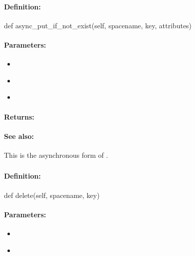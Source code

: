 \paragraph{Definition:}
\begin{pythoncode}
def async_put_if_not_exist(self, spacename, key, attributes)
\end{pythoncode}

\paragraph{Parameters:}
\begin{itemize}[noitemsep]
\item {}\\

\item {}\\

\item {}\\

\end{itemize}

\paragraph{Returns:}


\paragraph{See also:}  This is the asynchronous form of .

\pagebreak
\subsubsection{}
\label{api:python:del}


\paragraph{Definition:}
\begin{pythoncode}
def delete(self, spacename, key)
\end{pythoncode}

\paragraph{Parameters:}
\begin{itemize}[noitemsep]
\item {}\\

\item {}\\

\end{itemize}

